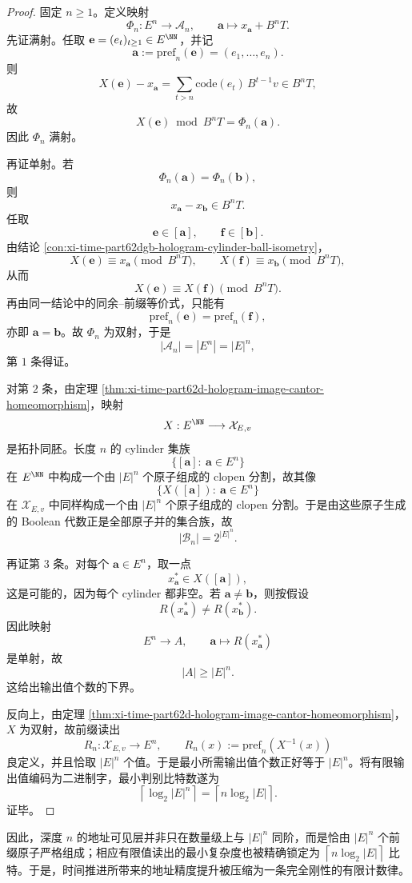 \begin{proof}
固定 \(n\ge 1\)。定义映射
\[
\Phi_n:E^n\longrightarrow \mathcal A_n,
\qquad
\mathbf a\longmapsto x_{\mathbf a}+B^nT.
\]
先证满射。任取 \(\mathbf e=(e_t)_{t\ge 1}\in E^{\NN}\)，并记
\[
\mathbf a:=\mathrm{pref}_n(\mathbf e)=(e_1,\dots,e_n).
\]
则
\[
X(\mathbf e)-x_{\mathbf a}
=
\sum_{t>n}\mathrm{code}(e_t)\,B^{t-1}v
\in B^nT,
\]
故
\[
X(\mathbf e)\bmod B^nT=\Phi_n(\mathbf a).
\]
因此 \(\Phi_n\) 满射。

再证单射。若
\[
\Phi_n(\mathbf a)=\Phi_n(\mathbf b),
\]
则
\[
x_{\mathbf a}-x_{\mathbf b}\in B^nT.
\]
任取
\[
\mathbf e\in[\mathbf a],
\qquad
\mathbf f\in[\mathbf b].
\]
由结论 \ref{con:xi-time-part62dgb-hologram-cylinder-ball-isometry}，
\[
X(\mathbf e)\equiv x_{\mathbf a}\pmod{B^nT},
\qquad
X(\mathbf f)\equiv x_{\mathbf b}\pmod{B^nT},
\]
从而
\[
X(\mathbf e)\equiv X(\mathbf f)\pmod{B^nT}.
\]
再由同一结论中的同余--前缀等价式，只能有
\[
\mathrm{pref}_n(\mathbf e)=\mathrm{pref}_n(\mathbf f),
\]
亦即 \(\mathbf a=\mathbf b\)。故 \(\Phi_n\) 为双射，于是
\[
|\mathcal A_n|=|E^n|=|E|^n,
\]
第 \(1\) 条得证。

对第 \(2\) 条，由定理 \ref{thm:xi-time-part62d-hologram-image-cantor-homeomorphism}，映射
\[
X:E^{\NN}\longrightarrow \mathcal X_{E,v}
\]
是拓扑同胚。长度 \(n\) 的 cylinder 集族
\[
\{[\mathbf a]:\ \mathbf a\in E^n\}
\]
在 \(E^{\NN}\) 中构成一个由 \(|E|^n\) 个原子组成的 clopen 分割，故其像
\[
\{X([\mathbf a]):\ \mathbf a\in E^n\}
\]
在 \(\mathcal X_{E,v}\) 中同样构成一个由 \(|E|^n\) 个原子组成的 clopen 分割。于是由这些原子生成的 Boolean 代数正是全部原子并的集合族，故
\[
|\mathcal B_n|=2^{|E|^n}.
\]

再证第 \(3\) 条。对每个 \(\mathbf a\in E^n\)，取一点
\[
x_{\mathbf a}^{\ast}\in X([\mathbf a]),
\]
这是可能的，因为每个 cylinder 都非空。若 \(\mathbf a\neq \mathbf b\)，则按假设
\[
R(x_{\mathbf a}^{\ast})\neq R(x_{\mathbf b}^{\ast}).
\]
因此映射
\[
E^n\longrightarrow A,
\qquad
\mathbf a\longmapsto R(x_{\mathbf a}^{\ast})
\]
是单射，故
\[
|A|\ge |E|^n.
\]
这给出输出值个数的下界。

反向上，由定理 \ref{thm:xi-time-part62d-hologram-image-cantor-homeomorphism}，\(X\) 为双射，故前缀读出
\[
R_n:\mathcal X_{E,v}\longrightarrow E^n,
\qquad
R_n(x):=\mathrm{pref}_n(X^{-1}(x))
\]
良定义，并且恰取 \(|E|^n\) 个值。于是最小所需输出值个数正好等于 \(|E|^n\)。将有限输出值编码为二进制字，最小判别比特数遂为
\[
\left\lceil \log_2|E|^n\right\rceil
=
\left\lceil n\log_2|E|\right\rceil.
\]
证毕。
\end{proof}

\noindent
因此，深度 \(n\) 的地址可见层并非只在数量级上与 \(|E|^n\) 同阶，而是恰由 \(|E|^n\) 个前缀原子严格组成；相应有限值读出的最小复杂度也被精确锁定为 \(\left\lceil n\log_2|E|\right\rceil\) 比特。于是，时间推进所带来的地址精度提升被压缩为一条完全刚性的有限计数律。

\endinput
